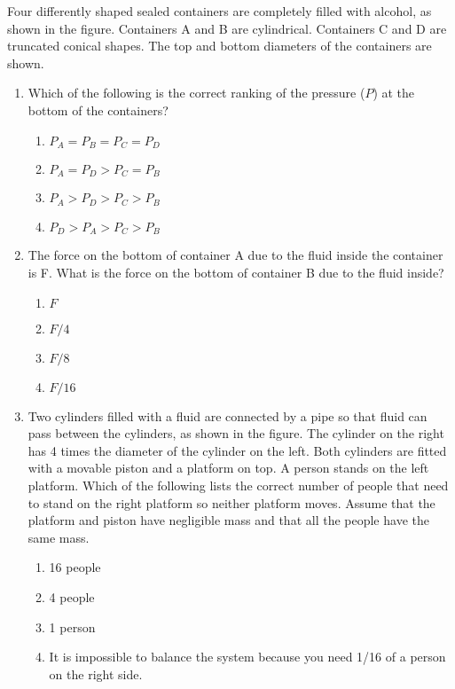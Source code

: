 \documentclass{../../oss-apphys}
\begin{document}
\begin{multicols}{2}
  Four differently shaped sealed containers are completely filled with alcohol,
  as shown in the figure. Containers A and B are cylindrical. Containers C and
  D are truncated conical shapes. The top and bottom diameters of the
  containers are shown.
  
  \begin{enumerate}[leftmargin=18pt,start=3]
    
  \item Which of the following is the correct ranking of the pressure ($P$) at
    the bottom of the containers?
    \begin{enumerate}[noitemsep,topsep=0pt,leftmargin=18pt,label=(\Alph*)]
    \item $P_A = P_B = P_C = P_D$
    \item $P_A = P_D > P_C = P_B$
    \item $P_A > P_D > P_C > P_B$
    \item $P_D > P_A > P_C > P_B$
    \end{enumerate}

  \item The force on the bottom of container A due to the fluid inside the
    container is F. What is the force on the bottom of container B due to
    the fluid inside?
    \begin{enumerate}[noitemsep,topsep=0pt,leftmargin=18pt,label=(\Alph*)]
    \item $F$
    \item $F/4$
    \item $F/8$
    \item $F/16$
    \end{enumerate}
    
  \item Two cylinders filled with a fluid are connected by a pipe so that fluid
    can pass between the cylinders, as shown in the figure. The cylinder
    on the right has 4 times the diameter of the cylinder on the left. Both
    cylinders are fitted with a movable piston and a platform on top. A
    person stands on the left platform. Which of the following lists the
    correct number of people that need to stand on the right platform so
    neither platform moves. Assume that the platform and piston have
    negligible mass and that all the people have the same mass.
    \begin{enumerate}[noitemsep,topsep=0pt,leftmargin=18pt,label=(\Alph*)]
    \item \num{16} people
    \item \num{4} people
    \item \num{1} person
    \item It is impossible to balance the system because you need 1/16 of a
      person on the right side.
    \end{enumerate}


\end{enumerate}
\end{multicols}
\end{document}
